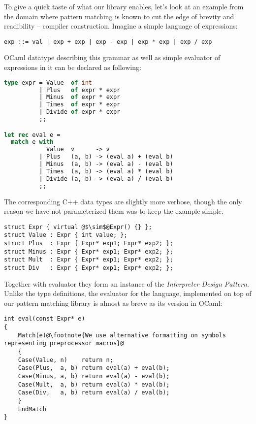 \documentclass[preprint]{sigplanconf}
\begin{document}
To give a quick taste of what our library enables, let's look at an example from 
the domain where pattern matching is known to cut the edge of brevity and 
readibility -- compiler construction. Imagine a simple language of expressions:

\begin{lstlisting}
exp ::= val | exp + exp | exp - exp | exp * exp | exp / exp
\end{lstlisting}

OCaml datatype describing this grammar as well as simple evaluator of expressions 
in it can be declared as following:

\begin{lstlisting}[language=Caml,keepspaces,columns=flexible]
type expr = Value  of int
          | Plus   of expr * expr
          | Minus  of expr * expr
          | Times  of expr * expr
          | Divide of expr * expr
          ;;

let rec eval e =
  match e with
            Value  v      -> v
          | Plus   (a, b) -> (eval a) + (eval b)
          | Minus  (a, b) -> (eval a) - (eval b)
          | Times  (a, b) -> (eval a) * (eval b)
          | Divide (a, b) -> (eval a) / (eval b)
          ;;
\end{lstlisting}

The corresponding C++ data types are slightly more verbose, though the only 
reason we have not parameterized them was to keep the example simple.

\begin{lstlisting}[keepspaces,columns=flexible]
struct Expr { virtual @$\sim$@Expr() {} };
struct Value : Expr { int value; };
struct Plus  : Expr { Expr* exp1; Expr* exp2; };
struct Minus : Expr { Expr* exp1; Expr* exp2; };
struct Mult  : Expr { Expr* exp1; Expr* exp2; };
struct Div   : Expr { Expr* exp1; Expr* exp2; };
\end{lstlisting}

Together with evaluator they form an instance of the \emph{Interpreter Design 
Pattern}\cite{DesignPatterns1993}. Unlike the type definitions, the evaluator 
for the language, implemented on top of our pattern matching library is almost 
as breve as its version in OCaml:

\begin{lstlisting}[keepspaces,columns=flexible]
int eval(const Expr* e)
{
    Match(e)@\footnote{We use alternative formatting on symbols representing preprocessor macros}@
    {
    Case(Value, n)    return n;
    Case(Plus,  a, b) return eval(a) + eval(b);
    Case(Minus, a, b) return eval(a) - eval(b);
    Case(Mult,  a, b) return eval(a) * eval(b);
    Case(Div,   a, b) return eval(a) / eval(b);
    }
    EndMatch
}
\end{lstlisting}
\end{document}
